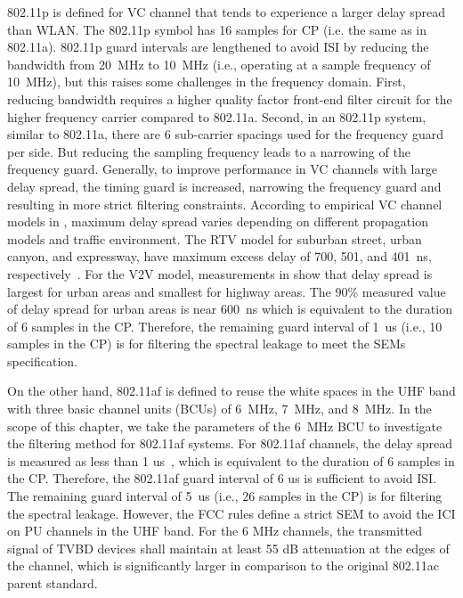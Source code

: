 802.11p is defined for VC channel that tends to experience a larger delay spread than WLAN.
The 802.11p symbol has 16 samples for CP (i.e. the same as in 802.11a).
802.11p guard intervals are lengthened to avoid ISI by reducing the bandwidth from 20~MHz to 10~MHz (i.e., operating at a sample frequency of 10~MHz), but this raises some challenges in the frequency domain.
First, reducing bandwidth requires a higher quality factor front-end filter circuit for the higher frequency carrier compared to 802.11a.
Second, in an 802.11p system, similar to 802.11a, there are 6 sub-carrier spacings used for the frequency guard per side. But reducing the sampling frequency leads to a narrowing of the frequency guard.
Generally, to improve performance in VC channels with large delay spread, the timing guard is increased, narrowing the frequency guard and resulting in more strict filtering constraints.
According to empirical VC channel models in \cite{Acosta-Marum2007,Sen2008}, maximum delay spread varies depending on different propagation models and traffic environment.
The RTV model for suburban street, urban canyon, and expressway, have maximum excess delay of 700, 501, and 401~ns, respectively~\cite{Acosta-Marum2007}.
For the V2V model, measurements in \cite{Sen2008} show that delay spread is largest for urban areas and smallest for highway areas.
The 90\% measured value of delay spread for urban areas is near 600~ns which is equivalent to the duration of 6 samples in the CP.
Therefore, the remaining guard interval of 1~us (i.e., 10 samples in the CP) is for filtering the spectral leakage to meet the SEMs specification.

On the other hand, 802.11af is defined to reuse the white spaces in the UHF band with three basic channel units (BCUs) of 6~MHz, 7~MHz, and 8~MHz.
In the scope of this chapter, we take the parameters of the 6~MHz BCU to investigate the filtering method for 802.11af systems.
For 802.11af channels, the delay spread is measured as less than 1 us~\cite{Lan2013}, which is equivalent to the duration of 6 samples in the CP.
Therefore, the 802.11af guard interval of 6 us is sufficient to avoid ISI. 
The remaining guard interval of 5~us (i.e., 26 samples in the CP) is for filtering the spectral leakage.
However,  the FCC rules define a strict  SEM to avoid the ICI on PU channels in the UHF band. 
For the 6 MHz channels, the transmitted signal of TVBD devices shall maintain at least 55 dB attenuation at the edges of the channel, which is significantly larger in comparison to the original 802.11ac parent  standard.

